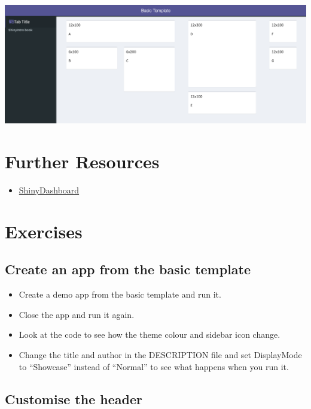 \documentclass[
]{book}
\providecommand{\tightlist}{%
  \setlength{\itemsep}{0pt}\setlength{\parskip}{0pt}}
\begin{document}
\includegraphics{images/sdb_column_layout.png}

\hypertarget{resources-shinydashboard}{%
\section{Further Resources}\label{resources-shinydashboard}}

\begin{itemize}
\tightlist
\item
  \href{https://rstudio.github.io/shinydashboard/}{ShinyDashboard}
\end{itemize}

\hypertarget{exercises-shinydashboard}{%
\section{Exercises}\label{exercises-shinydashboard}}

\hypertarget{create-an-app-from-the-basic-template}{%
\subsection{Create an app from the basic template}\label{create-an-app-from-the-basic-template}}

\begin{itemize}
\tightlist
\item
  Create a demo app from the basic template and run it.
\item
  Close the app and run it again.
\item
  Look at the code to see how the theme colour and sidebar icon change.
\item
  Change the title and author in the DESCRIPTION file and set DisplayMode to ``Showcase'' instead of ``Normal'' to see what happens when you run it.
\end{itemize}

\hypertarget{customise-the-header}{%
\subsection{Customise the header}\label{customise-the-header}}
\end{document}
